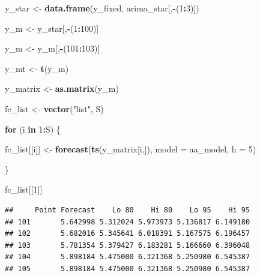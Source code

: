 \documentclass[]{article}
\newenvironment{Shaded}{\begin{snugshade}}{\end{snugshade}}
\newcommand{\ControlFlowTok}[1]{\textcolor[rgb]{0.13,0.29,0.53}{\textbf{#1}}}
\newcommand{\DataTypeTok}[1]{\textcolor[rgb]{0.13,0.29,0.53}{#1}}
\newcommand{\DecValTok}[1]{\textcolor[rgb]{0.00,0.00,0.81}{#1}}
\newcommand{\KeywordTok}[1]{\textcolor[rgb]{0.13,0.29,0.53}{\textbf{#1}}}
\newcommand{\NormalTok}[1]{#1}
\newcommand{\OperatorTok}[1]{\textcolor[rgb]{0.81,0.36,0.00}{\textbf{#1}}}
\newcommand{\OtherTok}[1]{\textcolor[rgb]{0.56,0.35,0.01}{#1}}
\newcommand{\StringTok}[1]{\textcolor[rgb]{0.31,0.60,0.02}{#1}}
\begin{document}
\begin{Shaded}
\begin{Highlighting}[]
\NormalTok{y_star <-}\StringTok{ }\KeywordTok{data.frame}\NormalTok{(y_fixed, arima_star[,}\OperatorTok{-}\NormalTok{(}\DecValTok{1}\OperatorTok{:}\DecValTok{3}\NormalTok{)])}

\NormalTok{y_m <-}\StringTok{ }\NormalTok{y_star[,}\OperatorTok{-}\NormalTok{(}\DecValTok{1}\OperatorTok{:}\DecValTok{100}\NormalTok{)]}

\NormalTok{y_m <-}\StringTok{ }\NormalTok{y_m[,}\OperatorTok{-}\NormalTok{(}\DecValTok{101}\OperatorTok{:}\DecValTok{103}\NormalTok{)]}

\NormalTok{y_mt <-}\StringTok{ }\KeywordTok{t}\NormalTok{(y_m)}

\NormalTok{y_matrix <-}\StringTok{ }\KeywordTok{as.matrix}\NormalTok{(y_m)}
\end{Highlighting}
\end{Shaded}

\begin{Shaded}
\begin{Highlighting}[]
\NormalTok{fc_list <-}\StringTok{ }\KeywordTok{vector}\NormalTok{(}\StringTok{"list"}\NormalTok{, S)}

\ControlFlowTok{for}\NormalTok{ (i }\ControlFlowTok{in} \DecValTok{1}\OperatorTok{:}\NormalTok{S) \{}
  
\NormalTok{  fc_list[[i]] <-}\StringTok{ }\KeywordTok{forecast}\NormalTok{(}\KeywordTok{ts}\NormalTok{(y_matrix[i,]), }\DataTypeTok{model =}\NormalTok{ aa_model, }\DataTypeTok{h =} \DecValTok{5}\NormalTok{)}

\NormalTok{\}}

\NormalTok{fc_list[[}\DecValTok{1}\NormalTok{]]}
\end{Highlighting}
\end{Shaded}

\begin{verbatim}
##     Point Forecast    Lo 80    Hi 80    Lo 95    Hi 95
## 101       5.642998 5.312024 5.973973 5.136817 6.149180
## 102       5.682016 5.345641 6.018391 5.167575 6.196457
## 103       5.781354 5.379427 6.183281 5.166660 6.396048
## 104       5.898184 5.475000 6.321368 5.250980 6.545387
## 105       5.898184 5.475000 6.321368 5.250980 6.545387
\end{verbatim}

\begin{Shaded}
\end{Shaded}
\end{document}
